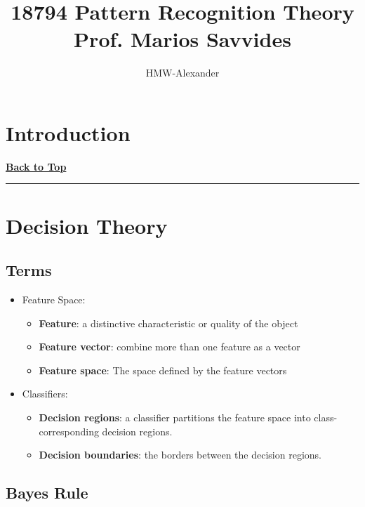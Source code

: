 \documentclass[letterpaper,10pt]{article}
\title{\textbf{18794 Pattern Recognition Theory\\Prof. Marios Savvides}}
\author{HMW-Alexander}
\newcommand{\pandochline}{\vspace{2em}\href{./document.html}{\textbf{Back to Top}}
	\vspace{-2em}\begin{center}\rule{\textwidth}{1pt}\end{center}}
\begin{document}
	
\maketitle

\tableofcontents
\newpage

\section{Introduction}

\pandochline
\section{Decision Theory}

\subsection{Terms}

\begin{itemize}
	\item Feature Space:
	\begin{itemize}
		\item \textbf{Feature}: a distinctive characteristic or quality of the object
		\item \textbf{Feature vector}: combine more than one feature as a vector
		\item \textbf{Feature space}: The space defined by the feature vectors
	\end{itemize}
	\item Classifiers:
	\begin{itemize}
		\item \textbf{Decision regions}: a classifier partitions the feature space into class-corresponding decision regions.
		\item \textbf{Decision boundaries}: the borders between the decision regions.
	\end{itemize}
\end{itemize}

\subsection{Bayes Rule}
\end{document}
